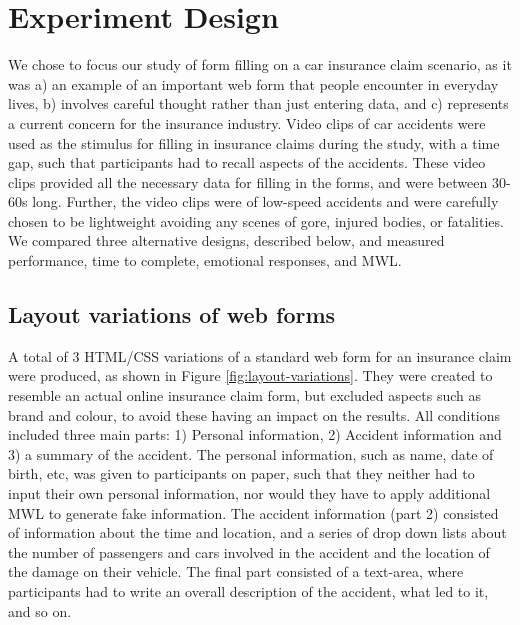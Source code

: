 \documentclass[../main/Feedback.tex]{subfiles}
\begin{document}
\section{Experiment Design}
We chose to focus our study of form filling on a car insurance claim scenario, as it was a) an example of an important web form that people encounter in everyday lives, b) involves careful thought rather than just entering data, and c) represents a current concern for the insurance industry. Video clips of car accidents were used as the stimulus for filling in insurance claims during the study, with a time gap, such that participants had to recall aspects of the accidents. These video clips provided all the necessary data for filling in the forms, and were between 30-60s long.
Further, the video clips were of low-speed accidents and were carefully chosen to be lightweight avoiding any scenes of gore, injured bodies, or fatalities. We compared three alternative designs, described below, and measured performance, time to complete, emotional responses, and MWL.

\subsection{Layout variations of web forms}
A total of 3 HTML/CSS variations of a standard web form for an insurance claim were produced, as shown in Figure \ref{fig:layout-variations}.
They were created to resemble an actual online insurance claim form, but excluded aspects such as brand and colour, to avoid these having an impact on the results.
All conditions included three main parts: 1) Personal information, 2) Accident information and 3) a summary of the accident.
The personal information, such as name, date of birth, etc, was given to participants on paper, such that they neither had to input their own personal information, nor would they have to apply additional MWL to generate fake information.
The accident information (part 2) consisted of information about the time and location, and a series of drop down lists about the number of passengers and cars involved in the accident and the location of the damage on their vehicle.
The final part consisted of a text-area, where participants had to write an overall description of the accident, what led to it, and so on.
\end{document}
